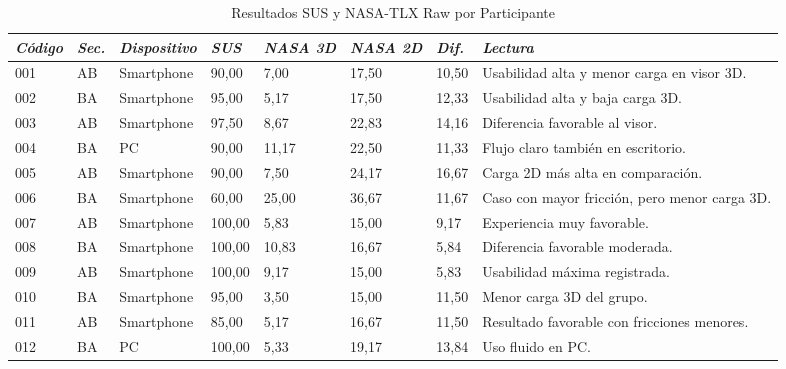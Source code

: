\begin{table}[htbp]
    \caption{Resultados SUS y NASA-TLX Raw por Participante}
    \label{tab:validacion_sus_nasa_participantes}
    \begin{tabularx}{\textwidth}{p{1.2cm}p{0.9cm}p{1.6cm}p{0.9cm}p{1.3cm}p{1.3cm}p{1.3cm}X}
        \hline
        \textit{Código} & \textit{Sec.} & \textit{Dispositivo} & \textit{SUS} & \textit{NASA 3D} & \textit{NASA 2D} & \textit{Dif.} & \textit{Lectura} \\ \hline
        001 & AB & Smartphone & 90,00 & 7,00 & 17,50 & 10,50 & Usabilidad alta y menor carga en visor 3D. \\
        002 & BA & Smartphone & 95,00 & 5,17 & 17,50 & 12,33 & Usabilidad alta y baja carga 3D. \\
        003 & AB & Smartphone & 97,50 & 8,67 & 22,83 & 14,16 & Diferencia favorable al visor. \\
        004 & BA & PC & 90,00 & 11,17 & 22,50 & 11,33 & Flujo claro también en escritorio. \\
        005 & AB & Smartphone & 90,00 & 7,50 & 24,17 & 16,67 & Carga 2D más alta en comparación. \\
        006 & BA & Smartphone & 60,00 & 25,00 & 36,67 & 11,67 & Caso con mayor fricción, pero menor carga 3D. \\
        007 & AB & Smartphone & 100,00 & 5,83 & 15,00 & 9,17 & Experiencia muy favorable. \\
        008 & BA & Smartphone & 100,00 & 10,83 & 16,67 & 5,84 & Diferencia favorable moderada. \\
        009 & AB & Smartphone & 100,00 & 9,17 & 15,00 & 5,83 & Usabilidad máxima registrada. \\
        010 & BA & Smartphone & 95,00 & 3,50 & 15,00 & 11,50 & Menor carga 3D del grupo. \\
        011 & AB & Smartphone & 85,00 & 5,17 & 16,67 & 11,50 & Resultado favorable con fricciones menores. \\
        012 & BA & PC & 100,00 & 5,33 & 19,17 & 13,84 & Uso fluido en PC. \\ \hline
    \end{tabularx}
\end{table}

